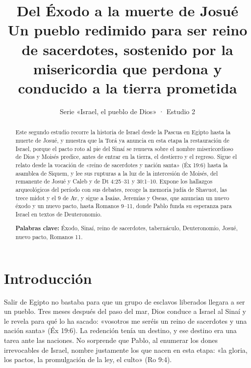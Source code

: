 \title{\color{ladrillo}\bfseries Del Éxodo a la muerte de Josué\\[4pt]\large\color{cafe}\mdseries Un pueblo redimido para ser reino de sacerdotes, sostenido por la misericordia que perdona y conducido a la tierra prometida}
\author{}\date{\color{sepia}Serie «Israel, el pueblo de Dios» · Estudio 2}

\maketitle\thispagestyle{empty}

\begin{abstract}\noindent
Este segundo estudio recorre la historia de Israel desde la Pascua en Egipto hasta la muerte de Josué, y muestra que la Torá ya anuncia en esta etapa la restauración de Israel, porque el pacto roto al pie del Sinaí se renueva sobre el nombre misericordioso de Dios y Moisés predice, antes de entrar en la tierra, el destierro y el regreso. Sigue el relato desde la vocación de «reino de sacerdotes y nación santa» (Éx 19:6) hasta la asamblea de Siquem, y lee sus rupturas a la luz de la intercesión de Moisés, del remanente de Josué y Caleb y de Dt 4:25–31 y 30:1–10. Expone los hallazgos arqueológicos del período con sus debates, recoge la memoria judía de Shavuot, las trece midot y el 9 de Av, y sigue a Isaías, Jeremías y Oseas, que anuncian un nuevo éxodo y un nuevo pacto, hasta Romanos 9–11, donde Pablo funda su esperanza para Israel en textos de Deuteronomio.
\par\smallskip\noindent\textbf{Palabras clave:} Éxodo, Sinaí, reino de sacerdotes, tabernáculo, Deuteronomio, Josué, nuevo pacto, Romanos 11.
\end{abstract}

\section{Introducción}

Salir de Egipto no bastaba para que un grupo de esclavos liberados llegara a ser un pueblo. Tres meses después del paso del mar, Dios conduce a Israel al Sinaí y le revela para qué lo ha sacado: «vosotros me seréis un reino de sacerdotes y una nación santa» (Éx 19:6). La redención tenía un destino, y ese destino era una tarea ante las naciones. No sorprende que Pablo, al enumerar los dones irrevocables de Israel, nombre justamente los que nacen en esta etapa: «la gloria, los pactos, la promulgación de la ley, el culto» (Ro 9:4).

